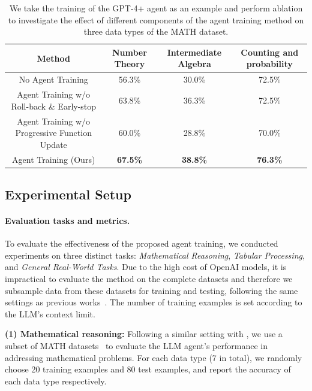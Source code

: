 \documentclass{article}
\theoremstyle{plain}
\theoremstyle{definition}
\theoremstyle{remark}
\begin{document}
\begin{table}[!t]
\centering
\setlength{\tabcolsep}{4pt} %
\renewcommand{\arraystretch}{0.9}
\begin{tabular}{cccc}
\toprule
\textbf{Method}         & Number Theory & Intermediate Algebra & Counting and probability \\ \hline
 
No Agent Training &  56.3\%        &   30.0\%               &  72.5\%                     \\
Agent Training w/o Roll-back \& Early-stop      &  63.8\%         &   36.3\%               &  72.5\%                     \\
Agent Training w/o Progressive Function Update     &  60.0\%       &   28.8\%               &  70.0\%         \\

\rowcolor[gray]{0.9} Agent Training (Ours) & \textbf{67.5\% }               &  \textbf{38.8\% }                    &  \textbf{76.3\%}                        \\ 
\bottomrule
\end{tabular}
\caption{We take the training of the GPT-4+ agent as an example and perform ablation to investigate the effect of different components of the agent training method on three data types of the MATH dataset.}
\label{tab:abla}
\end{table}



\subsection{Experimental Setup}
\label{sec_expsetup}
\paragraph{Evaluation tasks and metrics.}
To evaluate the effectiveness of the proposed agent training, we conducted experiments on three distinct tasks: \emph{Mathematical Reasoning}, \emph{Tabular Processing}, and \emph{General Real-World Tasks}. 
Due to the high cost of OpenAI models, it is impractical to evaluate the method on the complete datasets and therefore we subsample data from these datasets for training and testing, following the same settings as previous works~\cite{yuan2023craft, wu2023empirical}. The number of training examples is set according to the LLM's context limit.

\textbf{(1) Mathematical reasoning:}
Following a similar setting with \cite{yuan2023craft}, we use a subset of MATH datasets~\cite{hendrycks2021measuring} to evaluate the LLM agent's performance in addressing mathematical problems. 
For each data type (7 in total), we randomly choose 20 training examples and 80 test examples, and report the accuracy of each data type respectively. 
\end{document}
